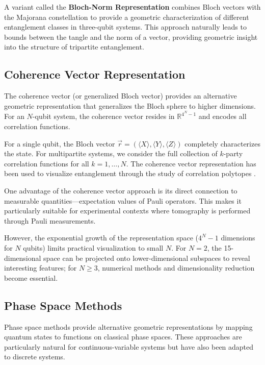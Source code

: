 \documentclass[12pt,a4paper]{article}
\begin{document}
A variant called the \textbf{Bloch-Norm Representation} combines Bloch vectors with the Majorana constellation to provide a geometric characterization of different entanglement classes in three-qubit systems. This approach naturally leads to bounds between the tangle and the norm of a vector, providing geometric insight into the structure of tripartite entanglement.

\subsection{Coherence Vector Representation}
\label{sec:coherence}

The coherence vector (or generalized Bloch vector) provides an alternative geometric representation that generalizes the Bloch sphere to higher dimensions. For an $N$-qubit system, the coherence vector resides in $\mathbb{R}^{4^N - 1}$ and encodes all correlation functions.

For a single qubit, the Bloch vector $\vec{r} = (\langle X \rangle, \langle Y \rangle, \langle Z \rangle)$ completely characterizes the state. For multipartite systems, we consider the full collection of $k$-party correlation functions for all $k = 1, \ldots, N$. The coherence vector representation has been used to visualize entanglement through the study of correlation polytopes \cite{EntangledGraphs}.

One advantage of the coherence vector approach is its direct connection to measurable quantities---expectation values of Pauli operators. This makes it particularly suitable for experimental contexts where tomography is performed through Pauli measurements.

However, the exponential growth of the representation space ($4^N - 1$ dimensions for $N$ qubits) limits practical visualization to small $N$. For $N = 2$, the 15-dimensional space can be projected onto lower-dimensional subspaces to reveal interesting features; for $N \geq 3$, numerical methods and dimensionality reduction become essential.

\subsection{Phase Space Methods}
\label{sec:phase-space}

Phase space methods provide alternative geometric representations by mapping quantum states to functions on classical phase spaces. These approaches are particularly natural for continuous-variable systems but have also been adapted to discrete systems.
\end{document}
